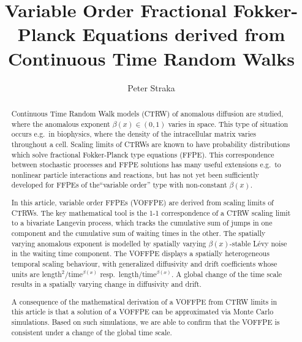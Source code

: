 \documentclass[a4paper,12pt]{elsarticle}
\numberwithin{equation}{section}
\theoremstyle{plain}
\theoremstyle{definition}
\theoremstyle{remark}
\numberwithin{equation}{section}
\newcommand{\1}{\mathbf 1}
\begin{document}
\begin{frontmatter}

\title{Variable Order Fractional Fokker-Planck Equations derived from 
Continuous Time Random Walks}
\author[UNSW]{Peter Straka}
\address[UNSW]{School of Mathematics \& Statistics, UNSW Sydney, Sydney NSW 2052, Australia}
 

\begin{abstract}
Continuous Time Random Walk models (CTRW) of anomalous diffusion are 
studied, 
where the anomalous exponent $\beta(x) \in (0,1)$ varies in space.  This 
type of situation occurs e.g.\ in biophysics, where the density of the 
intracellular matrix varies throughout a cell.  Scaling limits of CTRWs
are known to have probability distributions which solve fractional 
Fokker-Planck type equations (FFPE).  This correspondence between 
stochastic processes and FFPE solutions has many useful extensions e.g.\ 
to nonlinear particle interactions and reactions, but has not yet been
sufficiently developed for FFPEs of the``variable order'' type with non-constant 
$\beta(x)$. 

In this article, variable order FFPEs (VOFFPE) are derived from scaling 
limits of CTRWs.  The key mathematical tool is the 1-1 correspondence 
of a CTRW scaling limit to a bivariate Langevin process, which tracks the
cumulative sum of jumps in one component and the cumulative sum of waiting 
times in the other. The spatially varying anomalous exponent is
modelled by spatially varying $\beta(x)$-stable L\'evy noise in the 
waiting time component. 
The VOFFPE displays a spatially heterogeneous temporal scaling behaviour, 
with generalized diffusivity and drift coefficients whose units are 
length$^2$/time$^{\beta(x)}$ resp.\ length/time$^{\beta(x)}$. 
A global change of the time scale results in a spatially varying change in 
diffusivity and drift. 

A consequence of the mathematical derivation of a VOFFPE from CTRW limits 
in this article is that a solution of a VOFFPE can be approximated via 
Monte Carlo simulations.  
Based on such simulations, we are able to confirm that the VOFFPE is consistent under a 
change of the global time scale. 
\end{abstract}




\end{frontmatter}
\end{document}
